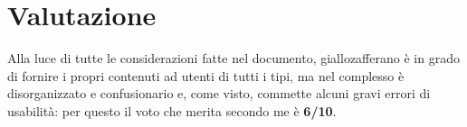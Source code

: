 \section{Valutazione}
Alla luce di tutte le considerazioni fatte nel documento, giallozafferano è in grado di fornire i propri contenuti ad utenti di tutti i tipi, ma nel complesso è disorganizzato e confusionario e, come visto, commette alcuni gravi errori di usabilità: per questo il voto che merita secondo me è \textbf{6/10}.
